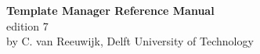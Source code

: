 \begin{titlepage}
\begin{center}
{\Huge \bf Template Manager Reference Manual} \\
\vspace{2mm}
{\Large edition 7} \\
\vspace{5mm}
{\Large by C. van Reeuwijk, Delft University of Technology}
\vspace{2cm}
\begin{center}

\end{center}
\end{center}
\end{titlepage}
